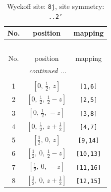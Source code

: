 \documentclass[fleqn,8pt]{jsarticle}
\begin{document}
\begin{longtable}{ccc}
\caption{Wyckoff site: {\tt 8j}, site symmetry: {\tt ..2'}}
 \\
 \hline \hline
No. & position & mapping \\ \hline \endfirsthead

\multicolumn{2}{l}{\tablename\ \thetable{}} \\
 \hline \hline
No. & position & mapping \\ \hline \endhead

 \hline \hline
\multicolumn{2}{r}{\footnotesize\it continued ...} \\ \endfoot

 \hline \hline
\multicolumn{2}{r}{} \\ \endlastfoot

1 & $\left[ 0,\, \frac{1}{2},\, z \right]$ & {\tt [1,6]} \\ \hline
2 & $\left[ 0,\, \frac{1}{2},\, \frac{1}{2} - z \right]$ & {\tt [2,5]} \\ \hline
3 & $\left[ 0,\, \frac{1}{2},\, - z \right]$ & {\tt [3,8]} \\ \hline
4 & $\left[ 0,\, \frac{1}{2},\, z + \frac{1}{2} \right]$ & {\tt [4,7]} \\ \hline
5 & $\left[ \frac{1}{2},\, 0,\, z \right]$ & {\tt [9,14]} \\ \hline
6 & $\left[ \frac{1}{2},\, 0,\, \frac{1}{2} - z \right]$ & {\tt [10,13]} \\ \hline
7 & $\left[ \frac{1}{2},\, 0,\, - z \right]$ & {\tt [11,16]} \\ \hline
8 & $\left[ \frac{1}{2},\, 0,\, z + \frac{1}{2} \right]$ & {\tt [12,15]} \\
\end{longtable}
\renewcommand{\arraystretch}{1.2}
\end{document}
